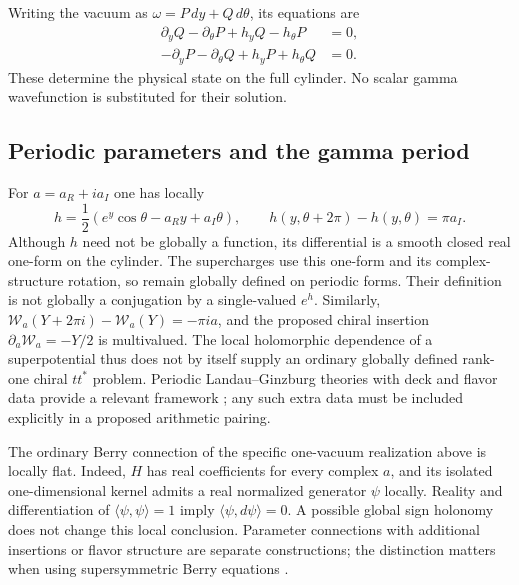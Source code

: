 Writing the vacuum as $\omega=P\,dy+Q\,d\theta$, its equations are
\begin{equation}
 \begin{split}
 \partial_yQ-\partial_\theta P+h_yQ-h_\theta P&=0,\\
 -\partial_yP-\partial_\theta Q+h_yP+h_\theta Q&=0.
 \end{split}
 \label{ext-vacuum-equations}
\end{equation}
These determine the physical state on the full cylinder.  No scalar
gamma wavefunction is substituted for their solution.

\subsection{Periodic parameters and the gamma period}
\label{ext-periodic-parameter}

For $a=a_R+ia_I$ one has locally
\begin{equation}
 h=\frac12(e^y\cos\theta-a_Ry+a_I\theta),\qquad
 h(y,\theta+2\pi)-h(y,\theta)=\pi a_I.
 \label{ext-period}
\end{equation}
Although $h$ need not be globally a function, its differential is a
smooth closed real one-form on the cylinder.  The supercharges use
this one-form and its complex-structure rotation, so remain globally
defined on periodic forms.  Their definition is not globally a
conjugation by a single-valued $e^h$.  Similarly,
$\mathcal W_a(Y+2\pi i)-\mathcal W_a(Y)=-\pi ia$, and the proposed
chiral insertion $\partial_a\mathcal W_a=-Y/2$ is multivalued.
The local holomorphic dependence of a superpotential thus does not
by itself supply an ordinary globally defined rank-one chiral
$tt^*$ problem.  Periodic Landau--Ginzburg theories with deck and
flavor data provide a relevant framework \cite{CGV}; any such extra
data must be included explicitly in a proposed arithmetic pairing.

The ordinary Berry connection of the specific one-vacuum realization
above is locally flat.  Indeed, $H$ has real coefficients for every
complex $a$, and its isolated one-dimensional kernel admits a real
normalized generator $\psi$ locally.  Reality and differentiation of
$\langle\psi,\psi\rangle=1$ imply
$\langle\psi,d\psi\rangle=0$.  A possible global sign holonomy does
not change this local conclusion.  Parameter connections with
additional insertions or flavor structure are separate constructions;
the distinction matters when using supersymmetric Berry equations
\cite{SonnerTong}.

